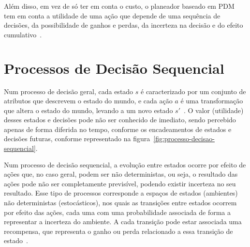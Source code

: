Além disso, em vez de só ter em conta o custo, o planeador baseado em PDM tem em conta a utilidade de uma ação que depende de uma sequência de decisões, da possibilidade de ganhos e perdas, da incerteza na decisão e do efeito cumulativo~\cite{isel:iasa:slides:processos-decisao-sequencial}.


\section{Processos de Decisão Sequencial}\label{sec:processos-de-decisao-sequencial}

Num processo de decisão geral, cada estado $s$ é caracterizado por um conjunto de atributos que descrevem o estado do mundo, e cada ação $a$ é uma transformação que altera o estado do mundo, levando a um novo estado $s'$~\cite{isel:iasa:slides:processos-decisao-sequencial}.
O valor (utilidade) desses estados e decisões pode não ser conhecido de imediato, sendo percebido apenas de forma diferida no tempo, conforme os encadeamentos de estados e decisões futuras, conforme representado na figura~\ref{fig:processo-decisao-sequencial}.

Num processo de decisão sequencial, a evolução entre estados ocorre por efeito de ações que, no caso geral, podem ser não deterministas, ou seja, o resultado das ações pode não ser completamente previsível, podendo existir incerteza no seu resultado.
Esse tipo de processos corresponde a espaços de estados (ambientes) não deterministas (estocásticos), nos quais as transições entre estados ocorrem por efeito das ações, cada uma com uma probabilidade associada de forma a representar a incerteza do ambiente. A cada transição pode estar associada uma recompensa, que representa o ganho ou perda relacionado a essa transição de estado~\cite{isel:iasa:slides:processos-decisao-sequencial}.

